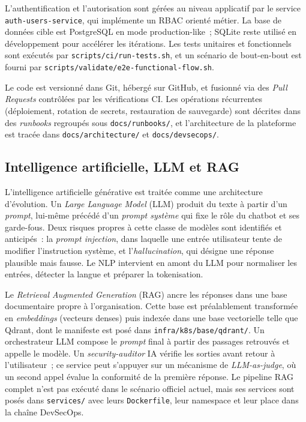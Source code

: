 L'authentification et l'autorisation sont gérées au niveau applicatif
par le service \texttt{auth-users-service}, qui implémente un RBAC orienté
métier. La base de données cible est PostgreSQL en mode production-like~;
SQLite reste utilisé en développement pour accélérer les itérations. Les
tests unitaires et fonctionnels sont exécutés par
\texttt{scripts/ci/run-tests.sh}, et un scénario de bout-en-bout est
fourni par \texttt{scripts/validate/e2e-functional-flow.sh}.

Le code est versionné dans Git, hébergé sur GitHub, et fusionné via des
\emph{Pull Requests} contrôlées par les vérifications CI. Les opérations
récurrentes (déploiement, rotation de secrets, restauration de
sauvegarde) sont décrites dans des \emph{runbooks} regroupés sous
\texttt{docs/runbooks/}, et l'architecture de la plateforme est tracée
dans \texttt{docs/architecture/} et \texttt{docs/devsecops/}.

\subsection{Intelligence artificielle, LLM et RAG}
\label{subsec:concepts-ia}

L'intelligence artificielle générative est traitée comme une architecture
d'évolution. Un \emph{Large Language Model} (LLM) produit du texte à
partir d'un \emph{prompt}, lui-même précédé d'un \emph{prompt système} qui
fixe le rôle du chatbot et ses garde-fous. Deux risques propres à cette
classe de modèles sont identifiés et anticipés~: la \emph{prompt
injection}, dans laquelle une entrée utilisateur tente de modifier
l'instruction système, et l'\emph{hallucination}, qui désigne une réponse
plausible mais fausse. Le NLP intervient en amont du LLM pour normaliser
les entrées, détecter la langue et préparer la tokenisation.

Le \emph{Retrieval Augmented Generation} (RAG) ancre les réponses dans
une base documentaire propre à l'organisation. Cette base est
préalablement transformée en \emph{embeddings} (vecteurs denses) puis
indexée dans une base vectorielle telle que Qdrant, dont le manifeste est
posé dans \texttt{infra/k8s/base/qdrant/}. Un orchestrateur LLM compose
le \emph{prompt} final à partir des passages retrouvés et appelle le
modèle. Un \emph{security-auditor} IA vérifie les sorties avant retour à
l'utilisateur~; ce service peut s'appuyer sur un mécanisme de
\emph{LLM-as-judge}, où un second appel évalue la conformité de la
première réponse. Le pipeline RAG complet n'est pas exécuté dans le
scénario officiel actuel, mais ses services sont posés dans
\texttt{services/} avec leurs \texttt{Dockerfile}, leur namespace et
leur place dans la chaîne DevSecOps.

